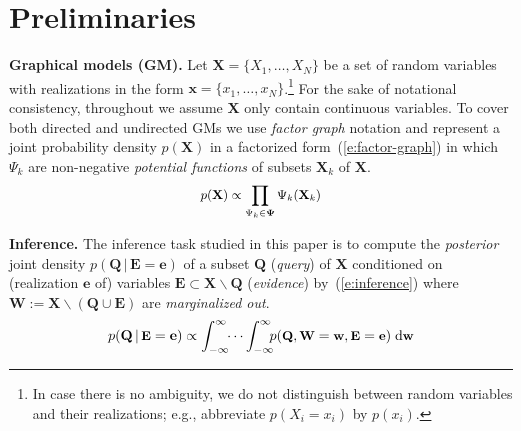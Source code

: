 \documentclass[letterpaper]{article}
\renewcommand{\vec}[1]{\mathbf{#1}}
\newcommand{\bvec}[1]{\textbf{#1}}
\newcommand{\pr}{p}
\newcommand{\dd}{\;\mathrm{d}} %
\begin{document}
\section{Preliminaries}
\label{sect:background}
{\bf Graphical models (GM).} Let $\vec{X} = \{X_1, \ldots, X_N\}$ be a set of random variables with realizations in the form 
$\vec{x} = \{x_1, \ldots, x_N\}$.\footnote{
In case there is no ambiguity, we do not distinguish between random variables and their realizations; e.g., abbreviate $\pr(X_i \!=\! x_i)$ by $\pr(x_i)$.}
For the sake of notational consistency, 
throughout we assume $\vec{X}$ only contain continuous variables. 
To cover both directed and undirected GMs we use
\emph{factor graph} notation \cite{kschischang2001factor}
and represent a joint probability density $\pr(\vec{X})$ in a factorized form~(\ref{e:factor-graph}) 
in which  $\Psi_k$ are non-negative \emph{potential functions} 
of subsets $\bvec{X}_k$ of $\bvec{X}$. 
\begin{equation} \footnotesize
\label{e:factor-graph}
\pr(\vec{X}) \propto \prod_{\Psi_k \in \boldsymbol\Psi} \Psi_k (\vec{X}_k)
\end{equation}


\noindent
{\bf Inference.} The inference task studied in this paper is to compute the \emph{posterior} joint density 
$\pr(\bvec{Q} \,|\, \bvec{E}=\bvec{e})$
of 
a subset $\bvec{Q}$ (\emph{query}) of $\bvec{X}$ 
conditioned on (realization $\bvec{e}$ of) 
variables  
$\bvec{E} \subset\bvec{X} \backslash \bvec{Q}$ (\emph{evidence}) by~(\ref{e:inference})  
where $\bvec{W} := \vec{X} \backslash (\vec{Q} \cup \vec{E})$ are \emph{marginalized out}.
\begin{equation}\vspace{-0.5mm}\footnotesize
\label{e:inference}
\pr(\vec{Q} \,|\, \bvec{E} =\vec{e}) \propto 
\int_{-\infty}^{\infty} \!\! \cdots \int_{-\infty}^{\infty}
\!\!\! \pr(\bvec{Q}, \bvec{W} = \bvec{w}, \bvec{E}=\bvec{e} )
 \dd \bvec{w}
\end{equation}
\end{document}
